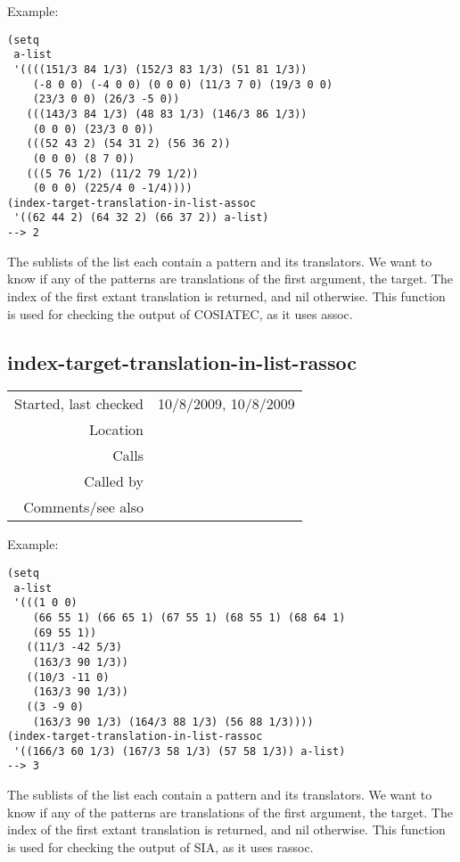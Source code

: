 \vspace{0.5cm}
\noindent Example:
\begin{verbatim}
(setq
 a-list
 '((((151/3 84 1/3) (152/3 83 1/3) (51 81 1/3))
    (-8 0 0) (-4 0 0) (0 0 0) (11/3 7 0) (19/3 0 0) 
    (23/3 0 0) (26/3 -5 0))
   (((143/3 84 1/3) (48 83 1/3) (146/3 86 1/3))
    (0 0 0) (23/3 0 0))
   (((52 43 2) (54 31 2) (56 36 2))
    (0 0 0) (8 7 0))
   (((5 76 1/2) (11/2 79 1/2))
    (0 0 0) (225/4 0 -1/4))))
(index-target-translation-in-list-assoc
 '((62 44 2) (64 32 2) (66 37 2)) a-list)
--> 2
\end{verbatim}

\noindent The sublists of the list each contain a
pattern and its translators. We want to know if any
of the patterns are translations of the first
argument, the target. The index of the first extant
translation is returned, and nil otherwise. This
function is used for checking the output of COSIATEC,
as it uses assoc.


\subsection*{index-target-translation-in-list-rassoc}\label{fun:index-target-translation-in-list-rassoc}

\vspace{0.3cm}
\begin{tabular}{r|p{8cm}}
Started, last checked & 10/8/2009, 10/8/2009 \\
Location & \nameref{sec:evaluation-for-SIA+} \\
Calls & \nameref{fun:test-translation} \\
Called by & \nameref{fun:number-of-targets-translation-in-list-rassoc} \\
Comments/see also &
\end{tabular}

\vspace{0.5cm}
\noindent Example:
\begin{verbatim}
(setq
 a-list
 '(((1 0 0)
    (66 55 1) (66 65 1) (67 55 1) (68 55 1) (68 64 1)
    (69 55 1))
   ((11/3 -42 5/3)
    (163/3 90 1/3))
   ((10/3 -11 0)
    (163/3 90 1/3))
   ((3 -9 0)
    (163/3 90 1/3) (164/3 88 1/3) (56 88 1/3))))
(index-target-translation-in-list-rassoc
 '((166/3 60 1/3) (167/3 58 1/3) (57 58 1/3)) a-list)
--> 3
\end{verbatim}

\noindent The sublists of the list each contain a
pattern and its translators. We want to know if any
of the patterns are translations of the first
argument, the target. The index of the first extant
translation is returned, and nil otherwise. This
function is used for checking the output of SIA, as it
uses rassoc.


